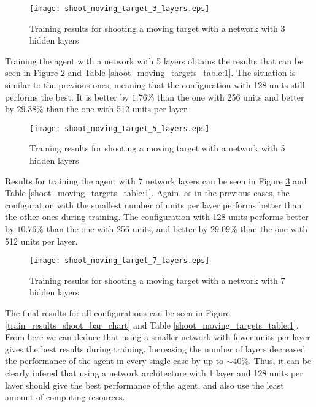 \begin{figure}
    \begin{center}
        \texttt{[image: shoot\_moving\_target\_3\_layers.eps]}
        \caption{Training results for shooting a moving target with a network with 3 hidden layers}
        \label{train_results_shoot_3_layers}
    \end{center}
\end{figure}

Training the agent with a network with 5 layers obtains the results that can be seen in Figure \ref{train_results_shoot_5_layers} and Table \ref{shoot_moving_targets_table:1}. The situation is similar to the previous ones, meaning that the configuration with 128 units still performs the best. It is better by $1.76\%$ than the one with 256 units and better by $29.38\%$ than the one with 512 units per layer.

\begin{figure}
    \begin{center}
        \texttt{[image: shoot\_moving\_target\_5\_layers.eps]}
        \caption{Training results for shooting a moving target with a network with 5 hidden layers}
        \label{train_results_shoot_5_layers}
    \end{center}
\end{figure}

Results for training the agent with 7 network layers can be seen in Figure \ref{train_results_shoot_7_layers} and Table \ref{shoot_moving_targets_table:1}. Again, as in the previous cases, the configuration with the smallest number of units per layer performs better than the other ones during training. The configuration with 128 units performs better by $10.76\%$ than the one with 256 units, and better by $29.09\%$ than the one with 512 units per layer.

\begin{figure}
    \begin{center}
        \texttt{[image: shoot\_moving\_target\_7\_layers.eps]}
        \caption{Training results for shooting a moving target with a network with 7 hidden layers}
        \label{train_results_shoot_7_layers}
    \end{center}
\end{figure}

The final results for all configurations can be seen in Figure \ref{train_results_shoot_bar_chart} and Table \ref{shoot_moving_targets_table:1}. From here we can deduce that using a smaller network with fewer units per layer gives the best results during training. Increasing the number of layers decreased the performance of the agent in every single case by up to $\sim40\%$. Thus, it can be clearly infered that using a network architecture with 1 layer and 128 units per layer should give the best performance of the agent, and also use the least amount of computing resources.

